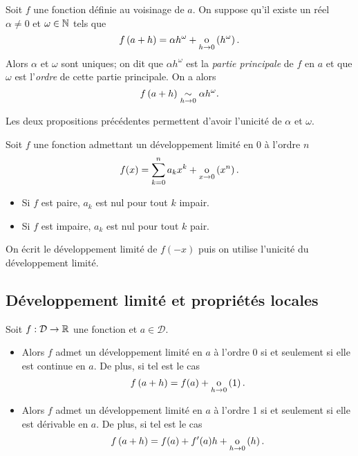 \documentclass{magnolia}
\begin{document}
\begin{definition}[utile=-3]
Soit $f$ une fonction définie au voisinage de $a$. On suppose qu'il existe
un réel $\alpha\neq 0$ et $\omega\in\mathbb{N}$ tels que
\[f\left(a+h\right)=\alpha h^\omega+\underset{h \rightarrow 0}{\text{o}}\left(h^\omega\right).\]
Alors $\alpha$ et $\omega$ sont uniques; on dit que $\alpha h^\omega$ est
la \emph{partie principale} de $f$ en $a$ et que $\omega$ est l'\emph{ordre} de
cette partie principale. On a alors
\[f\left(a+h\right)\underset{h\rightarrow 0}{\sim} \alpha h^\omega.\]
\end{definition}

\begin{preuve}
Les deux propositions précédentes permettent d'avoir l'unicité de $\alpha$ et $\omega$.
\end{preuve}



\begin{proposition}[utile=-3]
Soit $f$ une fonction admettant un développement limité en 0 à l'ordre $n$
\[f(x)=\sum_{k=0}^n a_k x^k+\underset{x \rightarrow 0}{\text{o}}\left(x^n\right).\]
\begin{itemize}
\item Si $f$ est paire, $a_k$ est nul pour tout $k$ impair.
\item Si $f$ est impaire, $a_k$ est nul pour tout $k$ pair.
\end{itemize}
\end{proposition}

\begin{preuve}
On écrit le développement limité de $f(-x)$ puis on utilise l'unicité du développement limité.
\end{preuve}

\subsection{Développement limité et propriétés locales}

\begin{proposition}[utile=-3]
Soit $f:\mathcal{D}\to\mathbb{R}$ une fonction et $a\in\mathcal{D}$.
\begin{itemize}
\item Alors $f$ admet un développement limité en $a$ à l'ordre 0 si et
  seulement si elle est continue en $a$. De plus, si tel est le cas
  \[f\left(a+h\right)=f(a)+\underset{h \rightarrow 0}{\text{o}}\left(1\right).\]
\item Alors $f$ admet un développement limité en $a$ à l'ordre 1 si et
  seulement si elle est dérivable en $a$. De plus, si tel est le cas
  \[f\left(a+h\right)=f(a)+f'(a)h+\underset{h \rightarrow 0}{\text{o}}\left(h\right).\]
\end{itemize}
\end{proposition}
\end{document}
